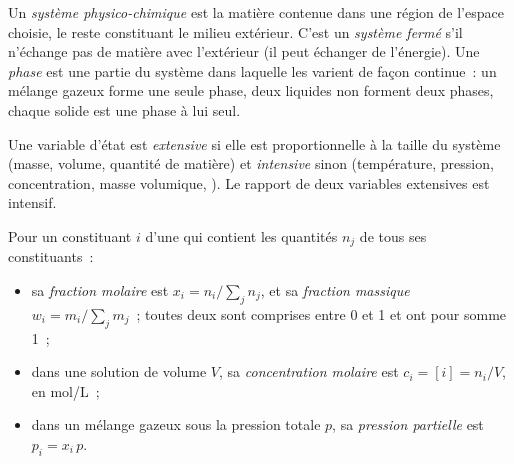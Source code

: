 \begin{definition}\label{def:b1:extent-q-and-k:system}
Un \emph{système physico-chimique} est la matière
contenue dans une région de l'espace choisie, le reste constituant le
milieu extérieur. C'est un \emph{système fermé} s'il
n'échange pas de matière avec l'extérieur (il peut échanger de
l'énergie). Une \emph{phase} est une partie du système dans
laquelle les  varient de façon continue~: un
mélange gazeux forme une seule phase, deux liquides non 
forment deux phases, chaque solide est une phase à lui seul.
\end{definition}

\begin{definition}\label{def:b1:extent-q-and-k:variables}
Une variable d'état est \emph{extensive} si elle
est proportionnelle à la taille du système (masse, volume, quantité de
matière) et \emph{intensive} sinon
(température, pression, concentration, masse volumique, ). Le rapport de deux variables extensives est intensif.
\end{definition}

\begin{definition}\label{def:b1:extent-q-and-k:composition}
Pour un constituant $i$ d'une  qui contient les quantités $n_j$ de
tous ses constituants~:
\begin{itemize}
  \item sa \emph{fraction molaire} est $x_i = n_i/\sum_j
        n_j$, et sa \emph{fraction massique} $w_i =
        m_i/\sum_j m_j$~; toutes deux sont comprises entre 0 et 1 et ont
        pour somme 1~;
  \item dans une solution de volume $V$, sa \emph{concentration
        molaire} est $c_i = [i] = n_i/V$,
        en \unit{mol/L}~;
  \item dans un mélange gazeux sous la pression totale $p$, sa
        \emph{pression partielle} est $p_i = x_i\,p$.
\end{itemize}
\end{definition}

